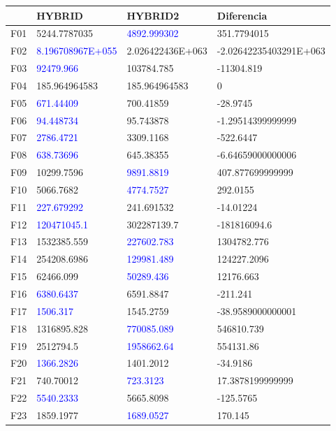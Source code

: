 \documentclass{article}
\begin{document}
\begin{table}[H]
	\centering
	\begin{tabular}{|l|ll|l|}
		\hline
		{} &	HYBRID & HYBRID2 & Diferencia\\ \hline
F01  &		5244.7787035 & \textcolor{blue}{4892.999302} & 351.7794015\\
F02  &		\textcolor{blue}{8.196708967E+055} & 2.026422436E+063 & -2.02642235403291E+063\\
F03  &		\textcolor{blue}{92479.966} & 103784.785 & -11304.819\\
F04  &		185.964964583 & 185.964964583 & 0\\
F05  &		\textcolor{blue}{671.44409} & 700.41859 & -28.9745\\
F06  &		\textcolor{blue}{94.448734} & 95.743878 & -1.29514399999999\\
F07  &		\textcolor{blue}{2786.4721} & 3309.1168 & -522.6447\\
F08  &		\textcolor{blue}{638.73696} & 645.38355 & -6.64659000000006\\
F09  &		10299.7596 & \textcolor{blue}{9891.8819} & 407.877699999999\\
F10  &		5066.7682 & \textcolor{blue}{4774.7527} & 292.0155\\
F11  &		\textcolor{blue}{227.679292} & 241.691532 & -14.01224\\
F12  &		\textcolor{blue}{120471045.1} & 302287139.7 & -181816094.6\\
F13  &		1532385.559 & \textcolor{blue}{227602.783} & 1304782.776\\
F14  &		254208.6986 & \textcolor{blue}{129981.489} & 124227.2096\\
F15  &		62466.099 & \textcolor{blue}{50289.436} & 12176.663\\
F16  &		\textcolor{blue}{6380.6437} & 6591.8847 & -211.241\\
F17  &		\textcolor{blue}{1506.317} & 1545.2759 & -38.9589000000001\\
F18  &		1316895.828 & \textcolor{blue}{770085.089} & 546810.739\\
F19  &		2512794.5 & \textcolor{blue}{1958662.64} & 554131.86\\
F20  &		\textcolor{blue}{1366.2826} & 1401.2012 & -34.9186\\
F21  &		740.70012 & \textcolor{blue}{723.3123} & 17.3878199999999\\
F22  &		\textcolor{blue}{5540.2333} & 5665.8098 & -125.5765\\
F23  &		1859.1977 & \textcolor{blue}{1689.0527} & 170.145\\

\end{tabular}
\end{table}
\end{document}

